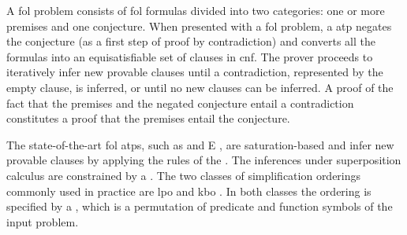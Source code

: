 




A \gls{fol} problem consists of \gls{fol} formulas divided into two categories:
one or more premises and one conjecture.
When presented with a \gls{fol} problem,
a  \gls{atp} negates the conjecture (as a first step of proof by contradiction)
and converts all the formulas into an equisatisfiable set of clauses in \gls{cnf}.
The prover proceeds to iteratively infer new provable clauses
until a contradiction, represented by the empty clause, is inferred,
or until no new clauses can be inferred.
A proof of the fact that the premises and the negated conjecture entail a contradiction
constitutes a proof that the premises entail the conjecture.

The state-of-the-art \gls{fol} \glspl{atp},
such as \vampire{} \cite{10.1007/978-3-642-39799-8_1} and E \cite{10.1007/978-3-030-29436-6_29},
are saturation-based and
infer new provable clauses by applying the rules of the .
The inferences under superposition calculus are constrained by a .
The two classes of simplification orderings commonly used in practice are
\gls{lpo} \cite{Kamin1980} and \gls{kbo} \cite{Knuth1983}.
In both classes the ordering is specified by a ,
which is a permutation of predicate and function symbols of the input problem.

